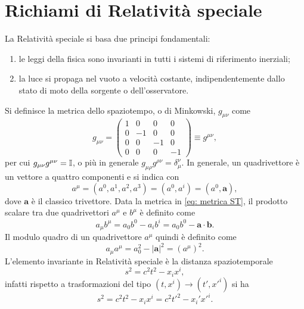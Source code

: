 \chapter{Richiami di Relatività speciale}
La Relatività speciale si basa due principi fondamentali:
\begin{enumerate}
    \item le leggi della fisica sono invarianti in tutti i sistemi di riferimento inerziali;
    \item la luce si propaga nel vuoto a velocità costante, indipendentemente dallo stato di moto della sorgente o dell'osservatore.
\end{enumerate}
Si definisce la metrica dello spaziotempo, o di Minkowski, $g_{\mu\nu}$ come
\begin{equation}
\label{eq: metrica ST}
    g_{\mu\nu} = 
    \begin{pmatrix}
        1 & 0 & 0 & 0 \\
        0 & -1 & 0 & 0 \\
        0 & 0 & -1 & 0 \\
        0 & 0 & 0 & -1
    \end{pmatrix}
    \equiv g^{\mu\nu},
\end{equation}
per cui $g_{\mu\nu}g^{\mu\nu} = \mathbb{I}$, o più in generale $g_{\mu\rho}g^{\rho\nu} = \delta^\nu_\mu$. In generale, un quadrivettore è un vettore a quattro componenti e si indica con
\begin{equation}
    a^\mu = (a^0,a^1,a^2,a^3) = (a^0,a^i) = (a^0,\bm{a}),
\end{equation}
dove $\bm{a}$ è il classico trivettore. Data la metrica in \eqref{eq: metrica ST}, il prodotto scalare tra due quadrivettori $a^\mu$ e $b^\mu$ è definito come
\begin{equation}
\label{eq: defn. prodotto scalare QV}
    a_\mu b^\mu = a_0b^0 - a_ib^i = a_0b^0 - \bm{a}\cdot\bm{b}.
\end{equation}
Il modulo quadro di un quadrivettore $a^\mu$ quindi è definito come
\begin{equation}
\label{eq: defn. modulo quadro QV}
    a_\mu a^\mu = a_0^2-|\bm{a}|^2 = (a^\mu)^2.
\end{equation}
L'elemento invariante in Relatività speciale è la distanza spaziotemporale
\begin{equation}
\label{eq: defn. s^2}
    s^2 = c^2t^2 - x_ix^i,
\end{equation}
infatti rispetto a trasformazioni del tipo $(t,x^i)\to(t',x'^i)$ si ha
\begin{equation}
\label{eq: invarianza s^2 per TdL}
    s^2 = c^2t^2 - x_ix^i = c^2t'^2 - x_i'x'^i.
\end{equation}
